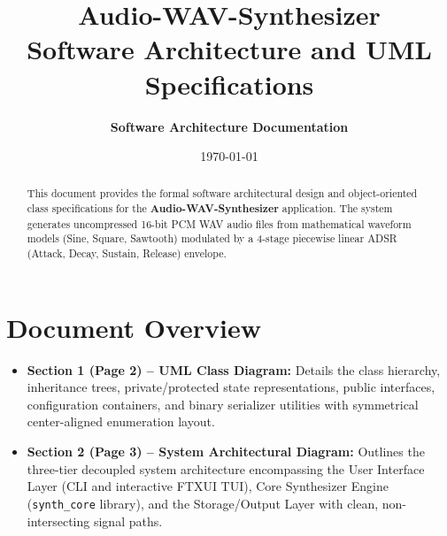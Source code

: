 \documentclass[11pt,a4paper]{article}
\begin{document}
\title{\textbf{\LARGE Audio-WAV-Synthesizer}\\[6pt]\large Software Architecture and UML Specifications}
\author{\textbf{Software Architecture Documentation}}
\date{\today}
\maketitle

\vspace{0.8cm}

\begin{abstract}
This document provides the formal software architectural design and object-oriented class specifications for the \textbf{Audio-WAV-Synthesizer} application. The system generates uncompressed 16-bit PCM WAV audio files from mathematical waveform models (Sine, Square, Sawtooth) modulated by a 4-stage piecewise linear ADSR (Attack, Decay, Sustain, Release) envelope.
\end{abstract}

\vspace{0.6cm}

\section*{Document Overview}
\begin{itemize}\setlength\itemsep{0.6em}
    \item \textbf{Section 1 (Page 2) -- UML Class Diagram:} Details the class hierarchy, inheritance trees, private/protected state representations, public interfaces, configuration containers, and binary serializer utilities with symmetrical center-aligned enumeration layout.
    \item \textbf{Section 2 (Page 3) -- System Architectural Diagram:} Outlines the three-tier decoupled system architecture encompassing the User Interface Layer (CLI and interactive FTXUI TUI), Core Synthesizer Engine (\texttt{synth\_core} library), and the Storage/Output Layer with clean, non-intersecting signal paths.
\end{itemize}

\clearpage

\end{document}
